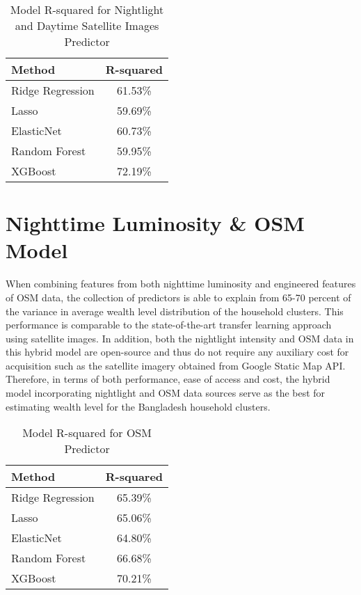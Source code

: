 \documentclass[solid,math,chem,code,plot,gloss]{bmc}
\begin{document}
\begin{table}[hbt!]
\begin{center}
\begin{tabular}{|l|c|}
\hline
Method & R-squared \\
\hline\hline\hline
Ridge Regression & 61.53\% \\
Lasso & 59.69\% \\
ElasticNet & 60.73\% \\
Random Forest & 59.95\% \\
XGBoost & 72.19\% \\

\hline
\end{tabular}
\end{center}
\label{tab:RMSEs}
\caption{Model R-squared for Nightlight and Daytime Satellite Images Predictor}
\end{table}

\section{Nighttime Luminosity \& OSM Model}

When combining features from both nighttime luminosity and engineered features of OSM data, the collection of predictors is able to explain from 65-70 percent of the variance in average wealth level distribution of the household clusters. This performance is comparable to the state-of-the-art transfer learning approach using satellite images. In addition, both the nightlight intensity and OSM data in this hybrid model are open-source and thus do not require any auxiliary cost for acquisition such as the satellite imagery obtained from Google Static Map API. Therefore, in terms of both performance, ease of access and cost, the hybrid model incorporating nightlight and OSM data sources serve as the best for estimating wealth level for the Bangladesh household clusters. 

\begin{table}[hbt!]
\begin{center}
\begin{tabular}{|l|c|}
\hline
Method & R-squared \\
\hline\hline\hline
Ridge Regression & 65.39\% \\
Lasso & 65.06\% \\
ElasticNet & 64.80\% \\
Random Forest & 66.68\% \\
XGBoost & 70.21\% \\

\hline
\end{tabular}
\end{center}
\label{tab:RMSEs}
\caption{Model R-squared for OSM Predictor}
\end{table}
\end{document}

